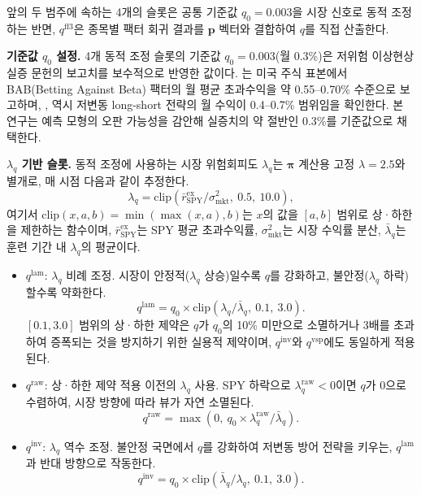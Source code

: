 \documentclass{article}
\begin{document}
앞의 두 범주에 속하는 4개의 슬롯은 공통 기준값 $q_0 = 0.003$을 시장 신호로 동적 조정하는 반면, $q^{\mathrm{ff3}}$은 종목별 팩터 회귀 결과를 $\mathbf{p}$ 벡터와 결합하여 $q$를 직접 산출한다.

\textbf{기준값 $q_0$ 설정.} 4개 동적 조정 슬롯의 기준값 $q_0 = 0.003$(월 0.3\%)은 저위험 이상현상 실증 문헌의 보고치를 보수적으로 반영한 값이다. \citet{frazzini2014}는 미국 주식 표본에서 BAB(Betting Against Beta) 팩터의 월 평균 초과수익을 약 0.55--0.70\% 수준으로 보고하며, \citet{baker2011}, \citet{blitz2007} 역시 저변동 long-short 전략의 월 수익이 0.4--0.7\% 범위임을 확인한다. 본 연구는 예측 모형의 오판 가능성을 감안해 실증치의 약 절반인 0.3\%를 기준값으로 채택한다.

\textbf{$\lambda_q$ 기반 슬롯.} 동적 조정에 사용하는 시장 위험회피도 $\lambda_q$는 $\boldsymbol{\pi}$ 계산용 고정 $\lambda = 2.5$와 별개로, 매 시점 다음과 같이 추정한다.
\begin{equation}
  \lambda_q = \mathrm{clip}\!\left(\bar{r}^{\mathrm{ex}}_{\mathrm{SPY}}/\sigma^2_{\mathrm{mkt}},\ 0.5,\ 10.0\right),
\end{equation}
여기서 $\mathrm{clip}(x, a, b) = \min(\max(x, a), b)$는 $x$의 값을 $[a, b]$ 범위로 상·하한을 제한하는 함수이며, $\bar{r}^{\mathrm{ex}}_{\mathrm{SPY}}$는 SPY 평균 초과수익률, $\sigma^2_{\mathrm{mkt}}$는 시장 수익률 분산, $\bar{\lambda}_q$는 훈련 기간 내 $\lambda_q$의 평균이다.

\begin{itemize}
  \item $q^{\mathrm{lam}}$: $\lambda_q$ 비례 조정. 시장이 안정적($\lambda_q$ 상승)일수록 $q$를 강화하고, 불안정($\lambda_q$ 하락)할수록 약화한다.
    \begin{equation}
      q^{\mathrm{lam}} = q_0 \times \mathrm{clip}\!\left(\lambda_q/\bar{\lambda}_q,\ 0.1,\ 3.0\right).
    \end{equation}
    $[0.1, 3.0]$ 범위의 상·하한 제약은 $q$가 $q_0$의 10\% 미만으로 소멸하거나 3배를 초과하여 증폭되는 것을 방지하기 위한 실용적 제약이며, $q^{\mathrm{inv}}$와 $q^{\mathrm{vsp}}$에도 동일하게 적용된다.

  \item $q^{\mathrm{raw}}$: 상·하한 제약 적용 이전의 $\lambda_q$ 사용. SPY 하락으로 $\lambda_q^{\mathrm{raw}} < 0$이면 $q$가 0으로 수렴하여, 시장 방향에 따라 뷰가 자연 소멸된다.
    \begin{equation}
      q^{\mathrm{raw}} = \max\!\left(0,\ q_0\times \lambda_q^{\mathrm{raw}}/\bar{\lambda}_q\right).
    \end{equation}

  \item $q^{\mathrm{inv}}$: $\lambda_q$ 역수 조정. 불안정 국면에서 $q$를 강화하여 저변동 방어 전략을 키우는, $q^{\mathrm{lam}}$과 반대 방향으로 작동한다.
    \begin{equation}
      q^{\mathrm{inv}} = q_0 \times \mathrm{clip}\!\left(\bar{\lambda}_q/\lambda_q,\ 0.1,\ 3.0\right).
    \end{equation}
\end{itemize}
\end{document}
